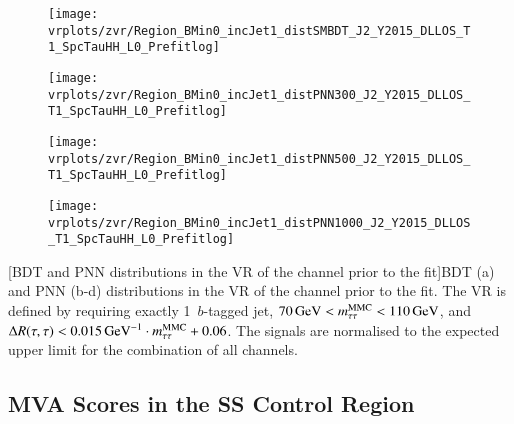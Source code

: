 {
  \centering

  \vspace*{1em}


  \begin{subfigure}{0.495\textwidth}
    \centering

    \texttt{[image: vrplots/zvr/Region\_BMin0\_incJet1\_distSMBDT\_J2\_Y2015\_DLLOS\_T1\_SpcTauHH\_L0\_Prefitlog]}
    \subcaption{}
  \end{subfigure}\hfill%
  \begin{subfigure}{0.495\textwidth}
    \centering

    \texttt{[image: vrplots/zvr/Region\_BMin0\_incJet1\_distPNN300\_J2\_Y2015\_DLLOS\_T1\_SpcTauHH\_L0\_Prefitlog]}
    \subcaption{}
  \end{subfigure}

  \begin{subfigure}{0.495\textwidth}
    \centering

    \texttt{[image: vrplots/zvr/Region\_BMin0\_incJet1\_distPNN500\_J2\_Y2015\_DLLOS\_T1\_SpcTauHH\_L0\_Prefitlog]}
    \subcaption{}
  \end{subfigure}\hfill%
  \begin{subfigure}{0.495\textwidth}
    \centering

    \texttt{[image: vrplots/zvr/Region\_BMin0\_incJet1\_distPNN1000\_J2\_Y2015\_DLLOS\_T1\_SpcTauHH\_L0\_Prefitlog]}
    \subcaption{}
  \end{subfigure}

  [BDT and PNN distributions in the \Zjets VR of the \hadhad
  channel prior to the fit]{BDT (a) and PNN (b-d) distributions in the \Zjets
    VR of the \hadhad channel prior to the fit. The \Zjets VR is defined by
    requiring exactly 1~$b$-tagged jet,
    $\SI{70}{\ensuremath{\text{GeV}}} < m_{\tau\tau}^\text{MMC} < \SI{110}{\ensuremath{\text{GeV}}}$, and
    $\dRtautau < \SI{0.015}{\per\GeV} \cdot \mMMC + 0.06$. The signals are
    normalised to the expected upper limit for the combination of all channels.}
}


\clearpage
\subsection*{MVA Scores in the SS Control Region}

